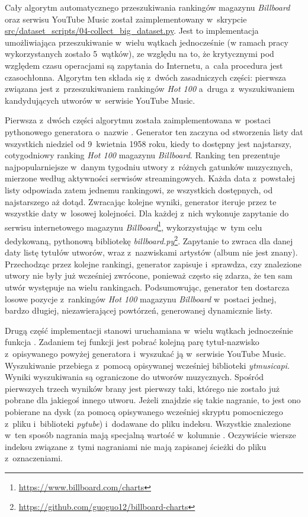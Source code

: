 Cały algorytm automatycznego przeszukiwania rankingów magazynu \emph{Billboard} oraz serwisu YouTube Music został zaimplementowany w~skrypcie \url{src/dataset_scripts/04-collect_big_dataset.py}. Jest to implementacja umożliwiająca przeszukiwanie w~wielu wątkach jednocześnie (w ramach pracy wykorzystanych zostało 5~wątków), ze względu na to, że krytycznymi pod względem czasu operacjami są zapytania do Internetu, a~cała procedura jest czasochłonna. Algorytm ten składa się z~dwóch zasadniczych części: pierwsza związana jest z~przeszukiwaniem rankingów \emph{Hot 100} a~druga z~wyszukiwaniem kandydujących utworów w~serwisie YouTube Music.

Pierwsza z~dwóch części algorytmu została zaimplementowana w~postaci pythonowego generatora o~nazwie . Generator ten zaczyna od stworzenia listy dat wszystkich niedziel od 9~kwietnia 1958 roku, kiedy to dostępny jest najstarszy, cotygodniowy ranking \emph{Hot 100} magazynu \emph{Billboard}. Ranking ten prezentuje najpopularniejsze w~danym tygodniu utwory z~różnych gatunków muzycznych, mierzone według aktywności serwisów streamingowych. Każda data z~powstałej listy odpowiada zatem jednemu rankingowi, ze wszystkich dostępnych, od najstarszego aż dotąd. Zwracając kolejne wyniki, generator iteruje przez te wszystkie daty w~losowej kolejności.  Dla każdej z~nich wykonuje zapytanie do serwisu internetowego magazynu \emph{Billboard}\footnote{\url{https://www.billboard.com/charts}}, wykorzystując w~tym celu dedykowaną, pythonową bibliotekę \emph{billboard.py}\footnote{\url{https://github.com/guoguo12/billboard-charts}}.  Zapytanie to zwraca dla danej daty listę tytułów utworów, wraz z~nazwiskami artystów (album nie jest znany). Przechodząc przez kolejne rankingi, generator zapisuje i~sprawdza, czy znalezione utwory nie były już wcześniej zwrócone, ponieważ często się zdarza, że ten sam utwór występuje na wielu rankingach. Podsumowując, generator ten dostarcza losowe pozycje z~rankingów \emph{Hot 100} magazynu \emph{Billboard} w~postaci jednej, bardzo długiej, niezawierającej powtórzeń, generowanej dynamicznie listy.

Drugą część implementacji stanowi uruchamiana w~wielu wątkach jednocześnie funkcja . Zadaniem tej funkcji jest pobrać kolejną parę tytuł-nazwisko z~opisywanego powyżej generatora i~wyszukać ją w~serwisie YouTube Music. Wyszukiwanie przebiega z~pomocą opisywanej wcześniej biblioteki \emph{ytmusicapi}. Wyniki wyszukiwania są ograniczone do utworów muzycznych. Spośród pierwszych trzech wyników brany jest pierwszy taki, którego  nie zostało już pobrane dla jakiegoś innego utworu. Jeżeli znajdzie się takie nagranie, to jest ono pobierane na dysk (za pomocą opisywanego wcześniej skryptu pomocniczego z~pliku i~biblioteki \emph{pytube}) i~dodawane do pliku indeksu. Wszystkie znalezione w~ten sposób nagrania mają specjalną wartość  w~kolumnie . Oczywiście wiersze indeksu związane z~tymi nagraniami nie mają zapisanej ścieżki do pliku z~oznaczeniami.

